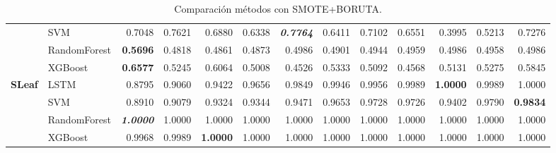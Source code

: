 \begin{table}[H]
\begin{adjustbox}{max width=14cm}
\begin{tabular}{|c|l|r|r|r|r|r|r|r|r|r|r|r|}
			                      & SVM          & 0.7048                   & 0.7621          & 0.6880          & 0.6338          & \textit{\textbf{0.7764}} & 0.6411          & 0.7102 & 0.6551 & 0.3995          & 0.5213                   & 0.7276                   \\
			                      & RandomForest & \textbf{0.5696}          & 0.4818          & 0.4861          & 0.4873          & 0.4986                   & 0.4901          & 0.4944 & 0.4959 & 0.4986          & 0.4958                   & 0.4986                   \\
			                      & XGBoost      & \textbf{0.6577}          & 0.5245          & 0.6064          & 0.5008          & 0.4526                   & 0.5333          & 0.5092 & 0.4568 & 0.5131          & 0.5275                   & 0.5845                   \\
			\hline
			\textbf{SLeaf}        & LSTM         & 0.8795                   & 0.9060          & 0.9422          & 0.9656          & 0.9849                   & 0.9946          & 0.9956 & 0.9989 & \textbf{1.0000} & 0.9989                   & 1.0000                   \\
			                      & SVM          & 0.8910                   & 0.9079          & 0.9324          & 0.9344          & 0.9471                   & 0.9653          & 0.9728 & 0.9726 & 0.9402          & 0.9790                   & \textbf{0.9834}          \\
			                      & RandomForest & \textit{\textbf{1.0000}} & 1.0000          & 1.0000          & 1.0000          & 1.0000                   & 1.0000          & 1.0000 & 1.0000 & 1.0000          & 1.0000                   & 1.0000                   \\
			                      & XGBoost      & 0.9968                   & 0.9989          & \textbf{1.0000} & 1.0000          & 1.0000                   & 1.0000          & 1.0000 & 1.0000 & 1.0000          & 1.0000                   & 1.0000                   \\
			\hline
		\end{tabular}
	\end{adjustbox}
	\caption{Comparación métodos con SMOTE+BORUTA.}
	\label{tab:all_comp_smote_boruta}
\end{table}


